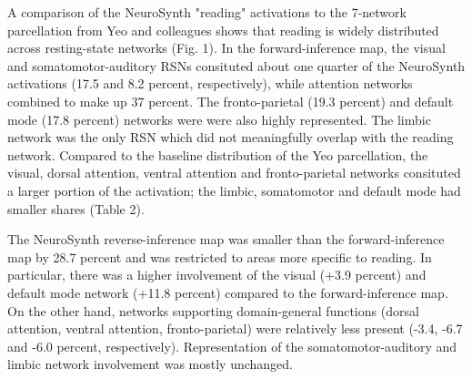A comparison of the NeuroSynth "reading" activations to the 7-network parcellation from Yeo and colleagues shows that reading is widely distributed across resting-state networks (Fig. 1). In the forward-inference map, the visual and somatomotor-auditory RSNs consituted about one quarter of the NeuroSynth activations (17.5 and 8.2 percent, respectively), while attention networks combined to make up 37 percent. The fronto-parietal (19.3 percent) and default mode (17.8 percent) networks were were also highly represented. The limbic network was the only RSN which did not meaningfully overlap with the reading network. Compared to the baseline distribution of the Yeo parcellation, the visual, dorsal attention, ventral attention and fronto-parietal networks consituted a larger portion of the activation; the limbic, somatomotor and default mode had smaller shares (Table 2). 

The NeuroSynth reverse-inference map was smaller than the forward-inference map by 28.7 percent and was restricted to areas more specific to reading. In particular, there was a higher involvement of the visual (+3.9 percent) and default mode network (+11.8 percent) compared to the forward-inference map. On the other hand, networks supporting domain-general functions (dorsal attention, ventral attention, fronto-parietal) were relatively less present (-3.4, -6.7 and -6.0 percent, respectively). Representation of the somatomotor-auditory and limbic network involvement was mostly unchanged.

